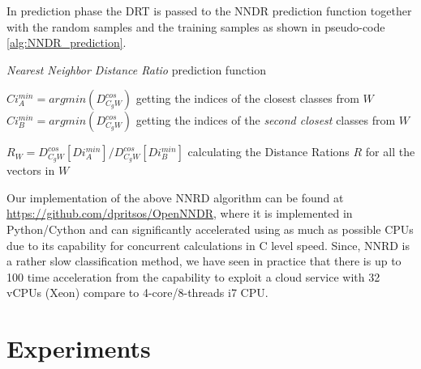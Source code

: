 \documentclass[runningheads]{llncs}
\begin{document}
In prediction phase the DRT is passed to the NNDR prediction function together with the random samples and the training samples as shown in pseudo-code \ref{alg:NNDR_prediction}.

\begin{algorithm}[H]
\caption{\textit{Nearest Neighbor Distance Ratio} prediction function}\label{alg:NNDR_prediction}


$Ci^{min}_{A} = argmin(D^{cos}_{C_{g}W})$ getting the indices of the closest classes from $W$\;
$Ci^{min}_{B} = argmin(D^{cos}_{C_{g}W})$ getting the indices of the \textit{second closest} classes from $W$\;

$R_{W} = D^{cos}_{C_{g}W}[Di^{min}_{A}] / D^{cos}_{C_{g}W}[Di^{min}_{B}]$ calculating the Distance Rations $R$ for all the vectors in $W$


\end{algorithm}

Our implementation of the above NNRD algorithm can be found at \url{https://github.com/dpritsos/OpenNNDR}, where it is implemented in Python/Cython and can significantly accelerated using as much as possible CPUs due to its capability for concurrent calculations in C level speed. Since, NNRD is a rather slow classification method, we have seen in practice that there is up to 100 time acceleration from the capability to exploit a cloud service with 32 vCPUs (Xeon) compare to 4-core/8-threads i7 CPU.

\section{Experiments}\label{sec:experimental_setup}
\end{document}
